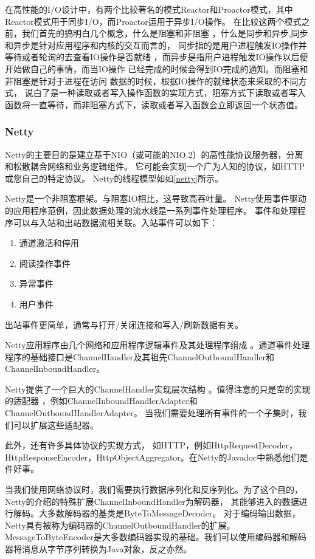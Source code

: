 在高性能的I/O设计中，有两个比较著名的模式Reactor和Proactor模式，其中Reactor模式用于同步I/O，而Proactor运用于异步I/O操作。
在比较这两个模式之前，我们首先的搞明白几个概念，什么是阻塞和非阻塞
，什么是同步和异步,同步和异步是针对应用程序和内核的交互而言的，
同步指的是用户进程触发IO操作并等待或者轮询的去查看IO操作是否就绪
，而异步是指用户进程触发IO操作以后便开始做自己的事情，而当IO操作
已经完成的时候会得到IO完成的通知。而阻塞和非阻塞是针对于进程在访问
数据的时候，根据IO操作的就绪状态来采取的不同方式，
说白了是一种读取或者写入操作函数的实现方式，阻塞方式下读取或者写入函数将一直等待，而非阻塞方式下，读取或者写入函数会立即返回一个状态值。
\subsubsection{Netty}
Netty的主要目的是建立基于NIO（或可能的NIO.2）的高性能协议服务器，分离和松散耦合网络和业务逻辑组件。
它可能会实现一个广为人知的协议，如HTTP或您自己的特定协议。
Netty的线程模型如如\ref{netty}所示。


Netty是一个非阻塞框架。与阻塞IO相比，这导致高吞吐量。
Netty使用事件驱动的应用程序范例，因此数据处理的流水线是一系列事件处理程序。
事件和处理程序可以与入站和出站数据流相关联。入站事件可以如下：

\begin{enumerate}
	\item 通道激活和停用
\item 阅读操作事件
\item 异常事件
\item 用户事件
\end{enumerate}
出站事件更简单，通常与打开/关闭连接和写入/刷新数据有关。

Netty应用程序由几个网络和应用程序逻辑事件及其处理程序组成
。通道事件处理程序的基础接口是ChannelHandler及其祖先ChannelOutboundHandler和ChannelInboundHandler。

Netty提供了一个巨大的ChannelHandler实现层次结构
。值得注意的只是空的实现的适配器
，例如ChannelInboundHandlerAdapter和ChannelOutboundHandlerAdapter。
当我们需要处理所有事件的一个子集时，我们可以扩展这些适配器。

此外，还有许多具体协议的实现方式，
如HTTP，例如HttpRequestDecoder，HttpResponseEncoder，HttpObjectAggregator。在Netty的Javadoc中熟悉他们是件好事。


当我们使用网络协议时，我们需要执行数据序列化和反序列化。为了这个目的，
Netty的介绍的特殊扩展ChannelInboundHandler为解码器，
其能够进入的数据进行解码。大多数解码器的基类是ByteToMessageDecoder。
对于编码输出数据，Netty具有被称为编码器的ChannelOutboundHandler的扩展。
MessageToByteEncoder是大多数编码器实现的基础。我们可以使用编码器和解码器将消息从字节序列转换为Java对象，反之亦然。

